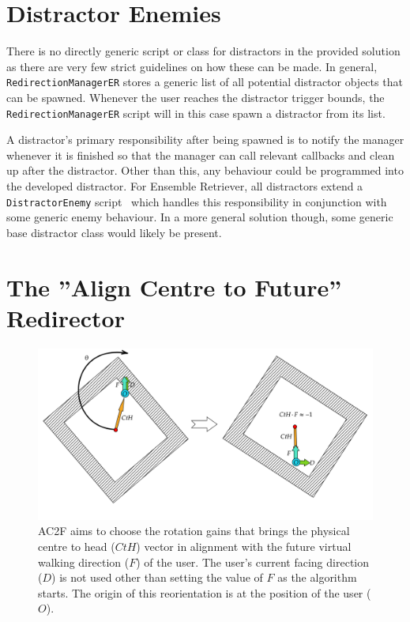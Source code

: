 \section{Distractor Enemies}
There is no directly generic script or class for distractors in the provided solution as there are very few strict guidelines on how these can be made. In general, \lstinline{RedirectionManagerER} stores a generic list of all potential distractor objects that can be spawned. Whenever the user reaches the distractor trigger bounds, the \lstinline{RedirectionManagerER} script will in this case spawn a distractor from its list.

A distractor's primary responsibility after being spawned is to notify the manager whenever it is finished so that the manager can call relevant callbacks and clean up after the distractor. Other than this, any behaviour could be programmed into the developed distractor. For Ensemble Retriever, all distractors extend a \lstinline{DistractorEnemy} script~\cite{distractorEnemyScript} which handles this responsibility in conjunction with some generic enemy behaviour. In a more general solution though, some generic base distractor class would likely be present.

\section{The ''Align Centre to Future'' Redirector}
\begin{figure}[htbp]
  \centering
  \includegraphics[width=\textwidth]{figures/graphs/AC2F.png}
  \caption[Align Centre to Future Algorithm Example]{AC2F aims to choose the rotation gains that brings the physical centre to head ($CtH$) vector in alignment with the future virtual walking direction ($F$) of the user. The user's current facing direction ($D$) is not used other than setting the value of $F$ as the algorithm starts. The origin of this reorientation is at the position of the user ($O$).}
  \label{fig:ac2f}
\end{figure}


